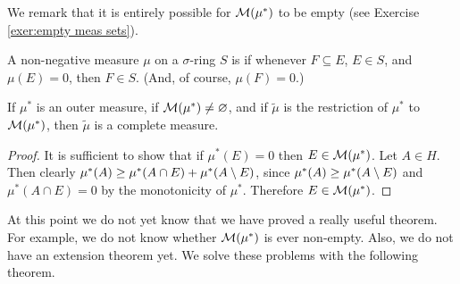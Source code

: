 We remark that it is entirely possible for ${\cal M}(\mu^*)$ to be empty (see Exercise \ref{exer:empty meas sets}).

\begin{definition}
A non-negative measure $\mu$ on a $\sigma$-ring ${S}$ is  if whenever $F \subseteq E$, $E \in S$, and $\mu(E)=0$, then $F\in S$. (And, of course, $\mu(F)=0$.)
\end{definition}

\begin{proposition}
If $\mu^*$ is an outer measure, if ${\cal M}(\mu^*) \neq \varnothing$, and if $\widetilde{\mu}$ is the restriction of $\mu^*$ to ${\cal M}(\mu^*)$, then $\widetilde{\mu}$ is a complete measure.
\end{proposition}

\begin{proof}
It is sufficient to show that if $\mu^*(E)=0$ then $E \in {\cal M}(\mu^*)$. Let $A \in H$. Then clearly $\mu^*(A) \geq \mu^*(A \cap E)+\mu^*(A\setminus E)$, since $\mu^*(A) \geq \mu^*(A\setminus E)$ and $\mu^*(A \cap E)=0$ by the monotonicity of $\mu^*$. Therefore $E \in {\cal M}(\mu^*)$.
\end{proof}

At this point we do not yet know that we have proved a really useful theorem. For example, we do not know whether ${\cal M}(\mu^*)$ is ever non-empty. Also, we do not have an extension theorem yet. We solve these problems with the following theorem.

